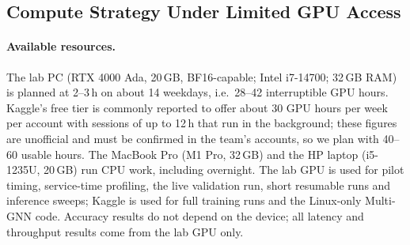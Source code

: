 \documentclass[11pt,a4paper]{article}
\begin{document}
\subsection{Compute Strategy Under Limited GPU Access}
\label{sec:compute_strategy}
\paragraph{Available resources.} The lab PC (RTX 4000 Ada, 20\,GB, BF16-capable; Intel i7-14700; 32\,GB RAM) is planned at 2--3\,h on about 14 weekdays, i.e.\ 28--42 interruptible GPU hours. Kaggle's free tier is commonly reported to offer about 30 GPU hours per week per account with sessions of up to 12\,h that run in the background; these figures are unofficial and must be confirmed in the team's accounts, so we plan with 40--60 usable hours. The MacBook Pro (M1 Pro, 32\,GB) and the HP laptop (i5-1235U, 20\,GB) run CPU work, including overnight. The lab GPU is used for pilot timing, service-time profiling, the live validation run, short resumable runs and inference sweeps; Kaggle is used for full training runs and the Linux-only Multi-GNN code. Accuracy results do not depend on the device; all latency and throughput results come from the lab GPU only.
\end{document}
